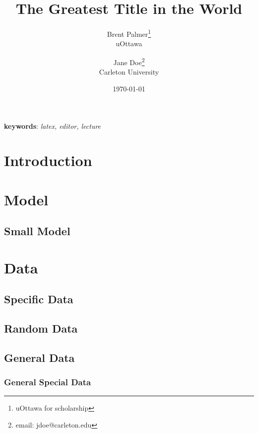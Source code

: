 \documentclass[12pt]{article}
\title{The Greatest Title in the World}
\author{Brent Palmer\thanks{uOttawa for scholarship}\\uOttawa \and Jane Doe\thanks{email: jdoe@carleton.edu}\\Carleton University}
\date{\today}
\begin{document}
\maketitle

\clearpage

\tableofcontents

\clearpage

\begin{abstract}
	\lipsum[7]
\end{abstract}

\textbf{keywords}: \emph{latex, editor, lecture}

\section*{Introduction}

\lipsum[2]

\section{Model}

\lipsum[3]

\subsection{Small Model}

\lipsum[12]

\section{Data}

\lipsum[4]

\subsection{Specific Data}

\lipsum[5]

\subsection{Random Data}

\lipsum[7]

\subsection{General Data}

\lipsum[6]

\subsubsection{General Special Data}
\end{document}
